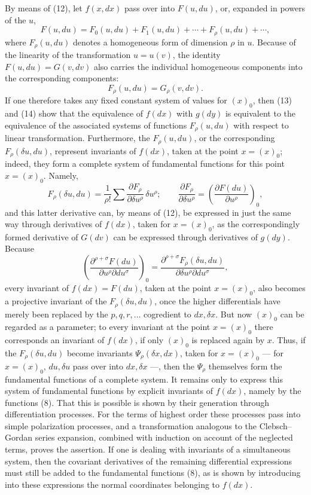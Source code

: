 \documentclass[11pt]{article}
\begin{document}
By means of (12), let \(f(x,dx)\) pass over into \(F(u,du)\), or,
expanded in powers of the \(u\),
\begin{equation}
F(u,du)=F_0(u,du)+F_1(u,du)+\cdots+F_\rho(u,du)+\cdots ,
\tag{13}
\end{equation}
where \(F_\rho(u,du)\) denotes a homogeneous form of dimension \(\rho\)
in \(u\). Because of the linearity of the transformation \(u=u(v)\), the
identity \(F(u,du)=G(v,dv)\) also carries the individual homogeneous
components into the corresponding components:
\begin{equation}
F_\rho(u,du)=G_\rho(v,dv).
\tag{14}
\end{equation}
If one therefore takes any fixed constant system of values for \((x)_0\),
then (13) and (14) show that the equivalence of \(f(dx)\) with \(g(dy)\)
is equivalent to the equivalence of the associated systems of functions
\(F_\rho(u,du)\) with respect to linear transformation. Furthermore, the
\(F_\rho(u,du)\), or the corresponding \(F_\rho(\delta u,du)\), represent
invariants of \(f(dx)\), taken at the point \(x=(x)_0\); indeed, they
form a complete system of fundamental functions for this point
\(x=(x)_0\). Namely,
\[
F_\rho(\delta u,du)=\frac1{\rho!}\sum
\frac{\partial F_\rho}{\partial \delta u^\rho}\,\delta u^\rho;
\qquad
\frac{\partial F_\rho}{\partial \delta u^\rho}
=\left(\frac{\partial F(du)}{\partial u^\rho}\right)_0,
\]
and this latter derivative can, by means of (12), be expressed in just
the same way through derivatives of \(f(dx)\), taken for \(x=(x)_0\), as
the correspondingly formed derivative of \(G(dv)\) can be expressed
through derivatives of \(g(dy)\). Because
\[
\left(\frac{\partial^{\rho+\sigma}F(du)}
{\partial u^\rho\partial du^\sigma}\right)_0
=
\frac{\partial^{\rho+\sigma}F_\rho(\delta u,du)}
{\partial\delta u^\rho\partial du^\sigma},
\]
every invariant of \(f(dx)=F(du)\), taken at the point \(x=(x)_0\), also
becomes a projective invariant of the \(F_\rho(\delta u,du)\), once the
higher differentials have merely been replaced by the \(p,q,r,\ldots\)
cogredient to \(dx,\delta x\). But now \((x)_0\) can be regarded as a
parameter; to every invariant at the point \(x=(x)_0\) there corresponds
an invariant of \(f(dx)\), if only \((x)_0\) is replaced again by \(x\).
Thus, if the \(F_\rho(\delta u,du)\) become invariants
\(\Psi_\rho(\delta x,dx)\), taken for \(x=(x)_0\) --- for \(x=(x)_0\),
\(du,\delta u\) pass over into \(dx,\delta x\) ---, then the
\(\Psi_\rho\) themselves form the fundamental functions of a complete
system. It remains only to express this system of fundamental functions
by explicit invariants of \(f(dx)\), namely by the functions (8). That
this is possible is shown by their generation through differentiation
processes. For the terms of highest order these processes pass into
simple polarization processes, and a transformation analogous to the
Clebsch--Gordan series expansion, combined with induction on account of
the neglected terms, proves the assertion. If one is dealing with
invariants of a simultaneous system, then the covariant derivatives of
the remaining differential expressions must still be added to the
fundamental functions (8), as is shown by introducing into these
expressions the normal coordinates belonging to \(f(dx)\).
\end{document}
